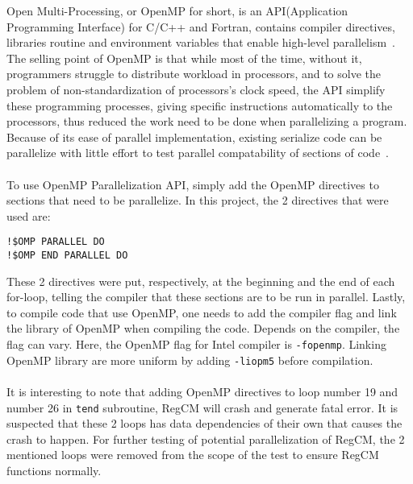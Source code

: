 Open Multi-Processing, or OpenMP for short, is an API(Application Programming Interface) for C/C++ and Fortran, contains compiler directives, libraries routine and environment variables that enable high-level parallelism~\cite{ompfaq}. The selling point of OpenMP is that while most of the time, without it, programmers struggle to distribute workload in processors, and to solve the problem of non-standardization of processors's clock speed, the API simplify these programming processes, giving specific instructions automatically to the processors, thus reduced the work need to be done when parallelizing a program. Because of its ease of parallel implementation, existing serialize code can be parallelize with little effort to test parallel compatability of sections of code~\cite{omp_intro}. \\
~\\
To use OpenMP Parallelization API, simply add the OpenMP directives to sections that need to be parallelize. In this project, the 2 directives that were used are: 
\begin{center}
\begin{BVerbatim}
!$OMP PARALLEL DO
!$OMP END PARALLEL DO
\end{BVerbatim}
\end{center}
These 2 directives were put, respectively, at the beginning and the end of each for-loop, telling the compiler that these sections are to be run in parallel. Lastly, to compile code that use OpenMP, one needs to add the compiler flag and link the library of OpenMP when compiling the code. Depends on the compiler, the flag can vary. Here, the OpenMP flag for Intel compiler is \verb|-fopenmp|. Linking OpenMP library are more uniform by adding \verb|-liopm5| before compilation. \\
~\\
It is interesting to note that adding OpenMP directives to loop number 19 and number 26 in \verb|tend| subroutine, RegCM will crash and generate fatal error. It is suspected that these 2 loops has data dependencies of their own that causes the crash to happen. For further testing of potential parallelization of RegCM, the 2 mentioned loops were removed from the scope of the test to ensure RegCM functions normally. 